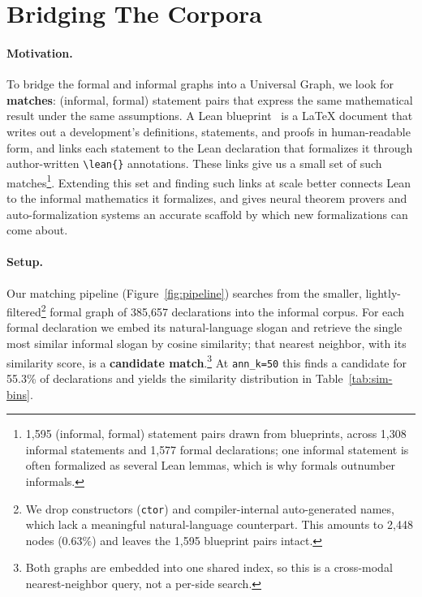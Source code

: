 \section{Bridging The Corpora}
\label{sec:bridging}

\newcommand{\nBlueprintPairs}{1{,}595\xspace}
\newcommand{\nBlueprintFormal}{1{,}577\xspace}
\newcommand{\nBlueprintInformal}{1{,}308\xspace}
\newcommand{\nSwept}{385{,}657\xspace}
\newcommand{\pctCandidate}{55.3\%\xspace}
\newcommand{\nJudged}{100{,}799\xspace}
\newcommand{\matchTotal}{47{,}952\xspace}
\newcommand{\matchRateAll}{48\%\xspace}
\newcommand{\rateNinety}{87\%\xspace}
\newcommand{\nNinety}{6{,}353\xspace}
\newcommand{\yieldSeventy}{23\%\xspace}
\newcommand{\yieldSixty}{2\%\xspace}
\newcommand{\dsMatch}{61{,}234\xspace}
\newcommand{\dsRate}{61\%\xspace}

\paragraph{Motivation.} To bridge the formal and informal graphs into a Universal Graph, we look for \textbf{matches}: (informal, formal) statement pairs that express the same mathematical result under the same assumptions. A Lean blueprint~\citep{massot2020leanblueprint} is a \LaTeX{} document that writes out a development's definitions, statements, and proofs in human-readable form, and links each statement to the Lean declaration that formalizes it through author-written \texttt{\textbackslash lean\{\}} annotations. These links give us a small set of such matches\footnote{\nBlueprintPairs{} (informal, formal) statement pairs drawn from blueprints, across \nBlueprintInformal{} informal statements and \nBlueprintFormal{} formal declarations; one informal statement is often formalized as several Lean lemmas, which is why formals outnumber informals.}. Extending this set and finding such links at scale better connects Lean to the informal mathematics it formalizes, and gives neural theorem provers and auto-formalization systems an accurate scaffold by which new formalizations can come about.

\paragraph{Setup.} Our matching pipeline (Figure~\ref{fig:pipeline}) searches from the smaller, lightly-filtered\footnote{We drop constructors (\texttt{ctor}) and compiler-internal auto-generated names, which lack a meaningful natural-language counterpart. This amounts to 2{,}448 nodes ($0.63\%$) and leaves the \nBlueprintPairs{} blueprint pairs intact.} formal graph of \nSwept{} declarations into the informal corpus. For each formal declaration we embed its natural-language slogan and retrieve the single most similar informal slogan by cosine similarity; that nearest neighbor, with its similarity score, is a \textbf{candidate match}.\footnote{Both graphs are embedded into one shared index, so this is a cross-modal nearest-neighbor query, not a per-side search.} At \texttt{ann\_k=50} this finds a candidate for \pctCandidate{} of declarations and yields the similarity distribution in Table~\ref{tab:sim-bins}.


